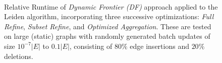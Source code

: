 \begin{figure}[!hbt]
  \centering
   \\[-2ex]
  \caption{Relative Runtime of \textit{Dynamic Frontier (DF)} approach applied to the Leiden algorithm, incorporating three successive optimizations: \textit{Full Refine}, \textit{Subset Refine}, and \textit{Optimized Aggregation}. These are tested on large (static) graphs with randomly generated batch updates of size $10^{-7}|E|$ to $0.1|E|$, consisting of $80\%$ edge insertions and $20\%$ deletions.}
  \label{fig:optimize-subrefine}
\end{figure}
